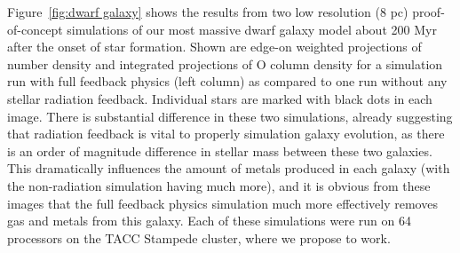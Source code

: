 \documentclass[11pt]{article}
\begin{document}
Figure~\ref{fig:dwarf galaxy} shows the results from two low resolution (8 pc) proof-of-concept simulations of our most massive dwarf galaxy model about 200 Myr after the onset of star formation. Shown are edge-on weighted projections of number density and integrated projections of O column density for a simulation run with full feedback physics (left column) as compared to one run without any stellar radiation feedback. Individual stars are marked with black dots in each image. There is substantial difference in these two simulations, already suggesting that radiation feedback is vital to properly simulation galaxy evolution, as there is an order of magnitude difference in stellar mass between these two galaxies. This dramatically influences the amount of metals produced in each galaxy (with the non-radiation simulation having much more), and it is obvious from these images that the full feedback physics simulation much more effectively removes gas and metals from this galaxy. Each of these simulations were run on 64 processors on the TACC Stampede cluster, where we propose to work. 
\end{document}
